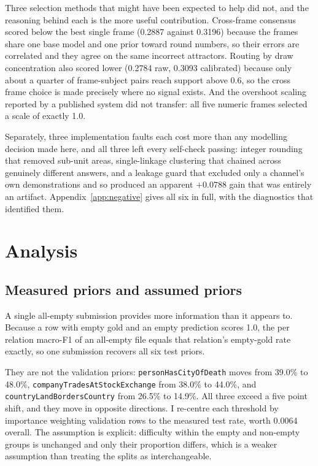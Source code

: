 \documentclass[11pt]{article}
\begin{document}
Three selection methods that might have been expected to help did not, and the
reasoning behind each is the more useful contribution. Cross-frame consensus
scored below the best single frame (0.2887 against 0.3196) because the frames
share one base model and one prior toward round numbers, so their errors are
correlated and they agree on the same incorrect attractors. Routing by draw
concentration also scored lower (0.2784 raw, 0.3093 calibrated) because only
about a quarter of frame-subject pairs reach support above 0.6, so the cross
frame choice is made precisely where no signal exists. And the overshoot scaling
reported by a published system did not transfer: all five numeric frames selected
a scale of exactly 1.0.

Separately, three implementation faults each cost more than any modelling
decision made here, and all three left every self-check passing: integer rounding
that removed sub-unit areas, single-linkage clustering that chained across
genuinely different answers, and a leakage guard that excluded only a channel's
own demonstrations and so produced an apparent $+0.0788$ gain that was entirely
an artifact. Appendix~\ref{app:negative} gives all six in full, with the
diagnostics that identified them.

\section{Analysis}

\subsection{Measured priors and assumed priors}

A single all-empty submission provides more information than it appears to.
Because a row with empty gold and an empty prediction scores 1.0, the per
relation macro-F1 of an all-empty file equals that relation's empty-gold rate
exactly, so one submission recovers all six test priors.

They are not the validation priors: \texttt{personHasCityOfDeath} moves from
39.0\% to 48.0\%, \texttt{companyTradesAtStockExchange} from 38.0\% to 44.0\%,
and \texttt{countryLandBordersCountry} from 26.5\% to 14.9\%. All three exceed a
five point shift, and they move in opposite directions. I re-centre each
threshold by importance weighting validation rows to the measured test rate,
worth 0.0064 overall. The assumption is explicit: difficulty within the empty and
non-empty groups is unchanged and only their proportion differs, which is a
weaker assumption than treating the splits as interchangeable.
\end{document}
